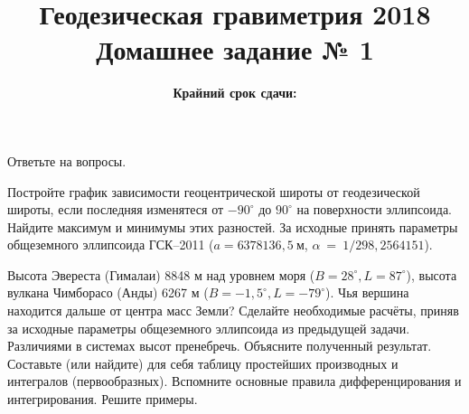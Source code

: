\documentclass[11pt, a4paper,addpoints]{exam}
\title{{\Large Геодезическая гравиметрия 2018}\\ 
    {\bf\Large Домашнее задание № 1}}
\author{}
\date{\normalsize\bf Крайний срок сдачи: \DTMusedate{deadline}}
\theoremstyle{remark}
\renewcommand{\phi}{\ensuremath{\varphi}}
\renewcommand{\theta}{\vartheta}
\begin{document}
\maketitle
\thispagestyle{empty}
\begin{questions}
    \question[1] Ответьте на вопросы.
    \question[1] Постройте график зависимости геоцентрической широты от геодезической широты, 
    если последняя изменятеся от $-90^\circ$ до $90^\circ$ на
    поверхности эллипсоида. Найдите максимум и минимумы этих разностей. За исходные принять параметры общеземного эллипсоида ГСК--2011 
    ($a = 6378136,5\ \text{м}$, $\alpha~=~1/298,2564151$).

    \question[1] Высота Эвереста (Гималаи) 8848 м над уровнем моря ($B = 28^\circ, L = 87^\circ$), 
    высота вулкана Чимборасо (Анды) 6267 м ($B = -1,5^\circ, L = -79^\circ$). Чья вершина находится дальше от
    центра масс Земли? 
    Сделайте необходимые расчёты, приняв за исходные параметры общеземного эллипсоида из предыдущей
    задачи. Различиями в системах высот пренебречь. Объясните полученный результат.
    \question[2] Составьте (или найдите) для себя таблицу простейших производных и интегралов (первообразных). Вспомните основные
    правила дифференцирования и интегрирования. Решите примеры.
    \begin{parts}

\end{parts}
\end{questions}
\end{document}
